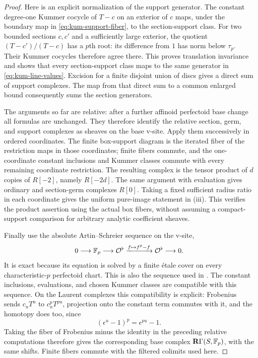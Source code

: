 \begin{proof}
Here is an explicit normalization of the support generator.
The constant degree-one Kummer cocycle of $T-c$ on an exterior
of $c$ maps, under the boundary map in
\cref{eq:kum-support-fiber}, to the section-support class.
For two bounded sections $c,c'$ and a sufficiently large exterior,
the quotient $(T-c')/(T-c)$ has a $p$th root: its difference from
$1$ has norm below $\tau_p$.  Their Kummer cocycles therefore
agree there.  This proves translation invariance and shows that
every section-support class maps to the same generator in
\cref{eq:kum-line-values}.  Excision for a finite disjoint union
of discs gives a direct sum of support complexes.  The map from
that direct sum to a common enlarged bound consequently sums
the section generators.

The arguments so far are relative: after a further affinoid
perfectoid base change all formulas are unchanged.  They
therefore identify the relative section, germ, and support
complexes as sheaves on the base v-site.  Apply them successively
in ordered coordinates.  The finite box-support diagram is the
iterated fiber of the restriction maps in those coordinates;
finite fibers commute, and the one-coordinate constant
inclusions and Kummer classes commute with every remaining
coordinate restriction.  The resulting complex is the tensor
product of $d$ copies of $R[-2]$, namely $R[-2d]$.
The same argument with evaluation gives ordinary and section-germ
complexes $R[0]$.  Taking a fixed sufficient radius ratio in each
coordinate gives the uniform pure-image statement in (iii).
This verifies the product assertion using the actual box fibers,
without assuming a compact-support comparison for arbitrary
analytic coefficient sheaves.

Finally use the absolute Artin--Schreier sequence on the v-site,
\begin{equation}\label{eq:kum-as}
 0\longrightarrow\mathbb F_p\longrightarrow\mathcal O^\flat
 \xrightarrow{f\mapsto f^p-f}\mathcal O^\flat\longrightarrow0.
\end{equation}
It is exact because its equation is solved by a finite \'etale
cover on every characteristic-$p$ perfectoid chart.  This is
also the sequence used in
\cite[proof of Theorem~5.1, p.~47]{scholzeHodge2013}.
The constant inclusions, evaluations, and chosen Kummer classes
are compatible with this sequence.  On the Laurent complexes
this compatibility is explicit: Frobenius sends $c_uT^u$ to
$c_u^pT^{pu}$, projection onto the constant term commutes with
it, and the homotopy does too, since
\[
 (\epsilon^u-1)^p=\epsilon^{pu}-1.
\]
Taking the fiber of Frobenius minus the identity in the preceding
relative computations therefore gives the corresponding base
complex $\mathbf R\Gamma(S,\mathbb F_p)$, with the same shifts.  Finite fibers
commute with the filtered colimits used here.


\end{proof}
